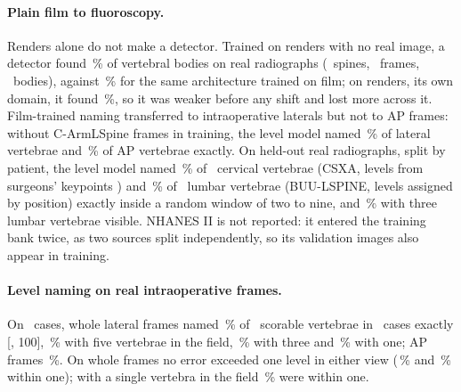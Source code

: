 \documentclass[11pt,letterpaper]{article}
\newcommand{\ci}[2]{[#1, #2]}
\begin{document}
\paragraph{Plain film to fluoroscopy.} Renders alone do not make a detector. Trained on renders with no real image, a detector found \clRenderDetRealFilmRecall\,\% of vertebral bodies on real radiographs (\clRenderDetRealFilmSpines\ spines, \clRenderDetRealFilmFrames\ frames, \clRenderDetRealFilmBodies\ bodies), against \clFilmDetRealFilmRecall\,\% for the same architecture trained on film; on renders, its own domain, it found \clRenderDetRendersRecall\,\%, so it was weaker before any shift and lost more across it. Film-trained naming transferred to intraoperative laterals but not to AP frames: without C-ArmLSpine frames in training, the level model named \clCarmZeroshotLatWholeExact\,\% of lateral vertebrae and \clCarmZeroshotApWholeExact\,\% of AP vertebrae exactly. On held-out real radiographs, split by patient, the level model named \clFilmNamingCsxaRandom\,\% of \clFilmNamingCsxaN\ cervical vertebrae (CSXA, levels from surgeons' keypoints \citep{csxa}) and \clFilmNamingBuuRandom\,\% of \clFilmNamingBuuN\ lumbar vertebrae (BUU-LSPINE, levels assigned by position) exactly inside a random window of two to nine, and \clFilmNamingBuuBandThree\,\% with three lumbar vertebrae visible. NHANES II is not reported: it entered the training bank twice, as two sources split independently, so its validation images also appear in training.
\paragraph{Level naming on real intraoperative frames.} On \clCarmCvFiveFrames\ cases, whole lateral frames named \clCarmCvFiveLatWholeExact\,\% of \clCarmCvFiveLatWholeVertebrae\ scorable vertebrae in \clCarmCvFiveLatWholeCases\ cases exactly \ci{\clCarmCvFiveLatWholeCiLo}{100}, \clCarmCvFiveLatKFiveExact\,\% with five vertebrae in the field, \clCarmCvFiveLatKThreeExact\,\% with three and \clCarmCvFiveLatKOneExact\,\% with one; AP frames \clCarmCvFiveApWholeExact\,\%. On whole frames no error exceeded one level in either view (\clCarmCvFiveLatWholeWithinOne\,\% and \clCarmCvFiveApWholeWithinOne\,\% within one); with a single vertebra in the field \clCarmCvFiveLatKOneWithinOne\,\% were within one.
\end{document}
